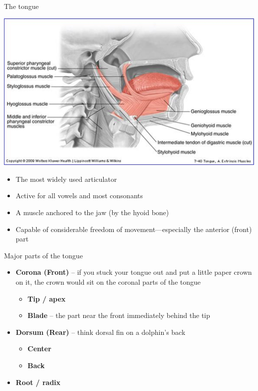 \documentclass[professionalfonts]{beamer}
\begin{document}
\begin{frame}{The tongue}
    \begin{multicols}{2}

        \includegraphics[width = \linewidth]{figs/Tongue.png}
        \columnbreak
        \begin{itemize}
            \item The most widely used articulator
            \item Active for all vowels and most consonants
            \item A muscle anchored to the jaw (by the hyoid bone)
            \item Capable of considerable freedom of movement—especially the anterior (front) part
        \end{itemize}
    \end{multicols}
\end{frame}

\begin{frame}{Major parts of the tongue}
    \begin{itemize}
        \item \textbf{Corona (Front)} – if you stuck your tongue out and put a little paper crown on it, the crown would sit on the coronal parts of the tongue
        \begin{itemize}
            \item \textbf{Tip / apex}
            \item \textbf{Blade} – the part near the front immediately behind the tip
        \end{itemize}
        \item \textbf{Dorsum (Rear)} – think dorsal fin on a dolphin’s back
        \begin{itemize}
            \item \textbf{Center}
            \item \textbf{Back}
        \end{itemize}
        \item \textbf{Root / radix}
    \end{itemize}
\end{frame}
\end{document}
